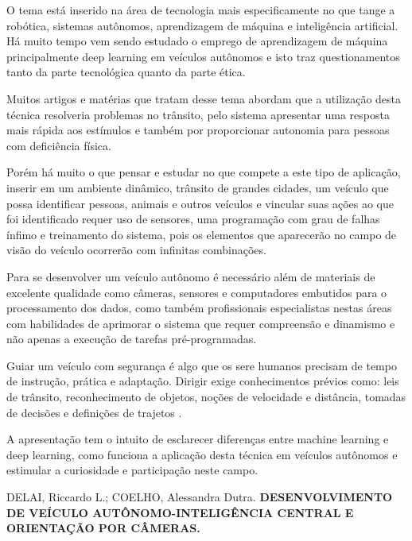 \documentclass[12pt,a4paper]{article}
\begin{document}
    \par O tema está inserido na área de tecnologia mais especificamente no que tange a robótica, sistemas autônomos, aprendizagem de máquina e inteligência artificial. Há muito tempo vem sendo estudado o emprego de aprendizagem de máquina principalmente deep learning em veículos autônomos e isto traz questionamentos tanto da parte tecnológica quanto da parte ética.
    \par Muitos artigos e matérias que tratam desse tema abordam que a utilização desta técnica resolveria problemas no trânsito, pelo sistema apresentar uma resposta mais rápida aos estímulos e também por proporcionar autonomia para pessoas com deficiência física.
    \par Porém há muito o que pensar e estudar no que compete a este tipo de aplicação, inserir em um ambiente dinâmico, trânsito de grandes cidades, um veículo que possa identificar pessoas, animais e outros veículos e vincular suas ações ao que foi identificado requer uso de sensores, uma programação com grau de falhas ínfimo e treinamento do sistema, pois os elementos que aparecerão no campo de visão do veículo ocorrerão com infinitas combinações.
    \par Para se desenvolver um veículo autônomo é necessário além de materiais de excelente qualidade como câmeras, sensores e computadores embutidos para o processamento dos dados, como também profissionais especialistas nestas áreas com habilidades de aprimorar o sistema que requer compreensão e dinamismo e não apenas a execução de tarefas pré-programadas.
    \par Guiar um veículo com segurança é algo que os sere humanos precisam de tempo de instrução, prática e adaptação. Dirigir exige conhecimentos prévios como: leis de trânsito, reconhecimento de objetos, noções de velocidade e distância, tomadas de decisões e definições de trajetos \cite{1}.
    \par A apresentação tem o intuito de esclarecer diferenças entre machine learning e deep learning, como funciona a aplicação desta técnica em veículos autônomos e estimular a curiosidade e participação neste campo.



     
    \begin{thebibliography}{BIBLIOGRAFIA}
 
         DELAI, Riccardo L.; COELHO, Alessandra Dutra. \textbf{DESENVOLVIMENTO DE VEÍCULO AUTÔNOMO-INTELIGÊNCIA CENTRAL E ORIENTAÇÃO POR CÂMERAS.}
    
    \end{thebibliography}
\end{document}
